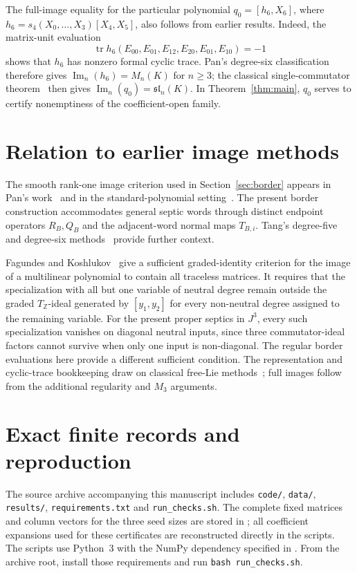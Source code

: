 \documentclass[11pt,reqno]{amsart}
\theoremstyle{definition}
\newcommand{\im}{\operatorname{Im}}
\newcommand{\tr}{\operatorname{tr}}
\begin{document}
The full-image equality for the particular polynomial $q_0=[h_6,X_6]$, where $h_6=s_4(X_0,\ldots,X_3)[X_4,X_5]$, also follows from earlier results.  Indeed, the matrix-unit evaluation
\[
 \tr h_6(E_{00},E_{01},E_{12},E_{20},E_{01},E_{10})=-1
\]
shows that $h_6$ has nonzero formal cyclic trace.  Pan's degree-six classification~\cite[Theorem~A]{Pan2026} therefore gives $\im_n(h_6)=M_n(K)$ for $n\ge3$; the classical single-commutator theorem~\cite{AlbertMuckenhoupt1957} then gives $\im_n(q_0)=\mathfrak{sl}_n(K)$.  In Theorem~\ref{thm:main}, $q_0$ serves to certify nonemptiness of the coefficient-open family.

\section{Relation to earlier image methods}\label{sec:context}
The smooth rank-one image criterion used in Section~\ref{sec:border} appears in Pan's work~\cite[Lemma~1.7 and Corollary~1.8]{Pan2026} and in the standard-polynomial setting~\cite[Lemma~9.1]{Miah2026}.  The present border construction accommodates general septic words through distinct endpoint operators $R_B,Q_B$ and the adjacent-word normal maps $T_{B,i}$.  Tang's degree-five and degree-six methods~\cite{Tang2026} provide further context.

Fagundes and Koshlukov~\cite[Theorem~5.2]{FagundesKoshlukov2023} give a sufficient graded-identity criterion for the image of a multilinear polynomial to contain all traceless matrices.  It requires that the specialization with all but one variable of neutral degree remain outside the graded $T_{\mathbb Z}$-ideal generated by $[y_1,y_2]$ for every non-neutral degree assigned to the remaining variable.  For the present proper septics in $J^3$, every such specialization vanishes on diagonal neutral inputs, since three commutator-ideal factors cannot survive when only one input is non-diagonal.  The regular border evaluations here provide a different sufficient condition.  The representation and cyclic-trace bookkeeping draw on classical free-Lie methods~\cite{Reutenauer1993}; full images follow from the additional regularity and $M_3$ arguments.

\appendix
\section{Exact finite records and reproduction}\label{app:verification}
The source archive accompanying this manuscript includes \texttt{code/}, \texttt{data/}, \texttt{results/}, \texttt{requirements.txt} and \texttt{run\_checks.sh}.  The complete fixed matrices and column vectors for the three seed sizes are stored in ; all coefficient expansions used for these certificates are reconstructed directly in the scripts.  The scripts use Python~3 with the NumPy dependency specified in .  From the archive root, install those requirements and run \texttt{bash run\_checks.sh}.
\end{document}
